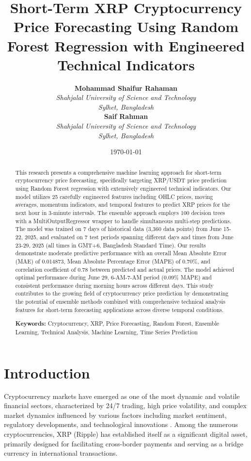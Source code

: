 \documentclass[11pt,a4paper]{article}
\title{\Large \textbf{Short-Term XRP Cryptocurrency Price Forecasting Using Random Forest Regression with Engineered Technical Indicators}}
\author{
\large\textbf{Mohammad Shaifur Rahaman} \\
\normalsize\textit{Shahjalal University of Science and Technology} \\
\normalsize\textit{Sylhet, Bangladesh} \\[0.5cm]
\large\textbf{Saif Rahman} \\
\normalsize\textit{Shahjalal University of Science and Technology} \\
\normalsize\textit{Sylhet, Bangladesh}
}
\date{\today}
\begin{document}
\maketitle

\begin{abstract}
This research presents a comprehensive machine learning approach for short-term cryptocurrency price forecasting, specifically targeting XRP/USDT price prediction using Random Forest regression with extensively engineered technical indicators. Our model utilizes 25 carefully engineered features including OHLC prices, moving averages, momentum indicators, and temporal features to predict XRP prices for the next hour in 3-minute intervals. The ensemble approach employs 100 decision trees with a MultiOutputRegressor wrapper to handle simultaneous multi-step predictions. The model was trained on 7 days of historical data (3,360 data points) from June 15-22, 2025, and evaluated on 7 test periods spanning different days and times from June 23-29, 2025 (all times in GMT+6, Bangladesh Standard Time). Our results demonstrate moderate predictive performance with an overall Mean Absolute Error (MAE) of 0.014873, Mean Absolute Percentage Error (MAPE) of 0.70\%, and correlation coefficient of 0.78 between predicted and actual prices. The model achieved optimal performance during June 29, 6-AM-7-AM period (0.09\% MAPE) and consistent performance during morning hours across different days. This study contributes to the growing field of cryptocurrency price prediction by demonstrating the potential of ensemble methods combined with comprehensive technical analysis features for short-term forecasting applications across diverse temporal conditions.

\textbf{Keywords:} Cryptocurrency, XRP, Price Forecasting, Random Forest, Ensemble Learning, Technical Analysis, Machine Learning, Time Series Prediction
\end{abstract}

\section{Introduction}

Cryptocurrency markets have emerged as one of the most dynamic and volatile financial sectors, characterized by 24/7 trading, high price volatility, and complex market dynamics influenced by various factors including market sentiment, regulatory developments, and technological innovations \cite{nakamoto2008bitcoin}. Among the numerous cryptocurrencies, XRP (Ripple) has established itself as a significant digital asset, primarily designed for facilitating cross-border payments and serving as a bridge currency in international transactions.
\end{document}
